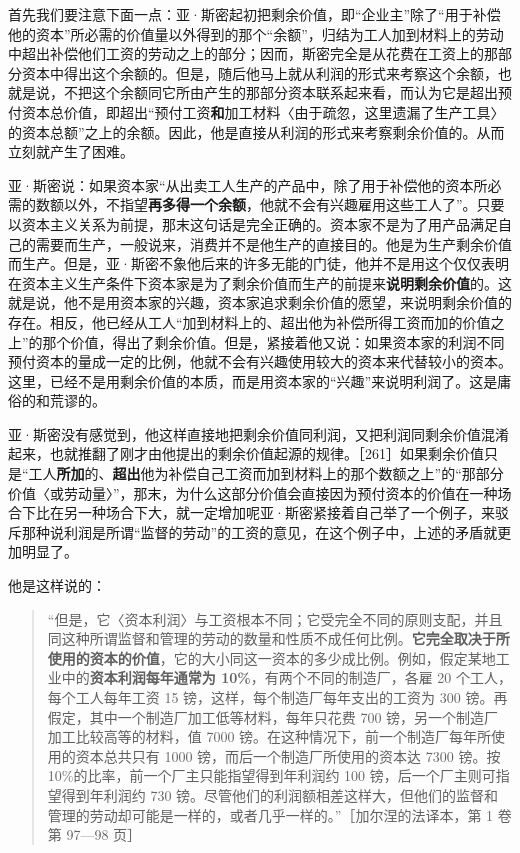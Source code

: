 首先我们要注意下面一点：亚·斯密起初把剩余价值，即“企业主”除了“用于补偿他的资本”所必需的价值量以外得到的那个“余额”，归结为工人加到材料上的劳动中超出补偿他们工资的劳动之上的部分；因而，斯密完全是从花费在工资上的那部分资本中得出这个余额的。但是，随后他马上就从利润的形式来考察这个余额，也就是说，不把这个余额同它所由产生的那部分资本联系起来看，而认为它是超出预付资本总价值，即超出“预付工资\textbf{和}加工材料〈由于疏忽，这里遗漏了生产工具〉的资本总额”之上的余额。因此，他是直接从利润的形式来考察剩余价值的。从而立刻就产生了困难。

亚·斯密说：如果资本家“从出卖工人生产的产品中，除了用于补偿他的资本所必需的数额以外，不指望\textbf{再多得一个余额}，他就不会有兴趣雇用这些工人了”。只要以资本主义关系为前提，那末这句话是完全正确的。资本家不是为了用产品满足自己的需要而生产，一般说来，消费并不是他生产的直接目的。他是为生产剩余价值而生产。但是，亚·斯密不象他后来的许多无能的门徒，他并不是用这个仅仅表明在资本主义生产条件下资本家是为了剩余价值而生产的前提来\textbf{说明剩余价值}的。这就是说，他不是用资本家的兴趣，资本家追求剩余价值的愿望，来说明剩余价值的存在。相反，他已经从工人“加到材料上的、超出他为补偿所得工资而加的价值之上”的那个价值，得出了剩余价值。但是，紧接着他又说：如果资本家的利润不同预付资本的量成一定的比例，他就不会有兴趣使用较大的资本来代替较小的资本。这里，已经不是用剩余价值的本质，而是用资本家的“兴趣”来说明利润了。这是庸俗的和荒谬的。

亚·斯密没有感觉到，他这样直接地把剩余价值同利润，又把利润同剩余价值混淆起来，也就推翻了刚才由他提出的剩余价值起源的规律。［261］如果剩余价值只是“工人\textbf{所加}的、\textbf{超出}他为补偿自己工资而加到材料上的那个数额之上”的“那部分价值〈或劳动量〉”，那末，为什么这部分价值会直接因为预付资本的价值在一种场合下比在另一种场合下大，就一定增加呢亚·斯密紧接着自己举了一个例子，来驳斥那种说利润是所谓“监督的劳动”的工资的意见，在这个例子中，上述的矛盾就更加明显了。

他是这样说的：

\begin{quote}“但是，它〈资本利润〉与工资根本不同；它受完全不同的原则支配，并且同这种所谓监督和管理的劳动的数量和性质不成任何比例。\textbf{它完全取决于所使用的资本的价值}，它的大小同这一资本的多少成比例。例如，假定某地工业中的\textbf{资本利润每年通常为 10\%}，有两个不同的制造厂，各雇 20 个工人，每个工人每年工资 15 镑，这样，每个制造厂每年支出的工资为 300 镑。再假定，其中一个制造厂加工低等材料，每年只花费 700 镑，另一个制造厂加工比较高等的材料，值 7000 镑。在这种情况下，前一个制造厂每年所使用的资本总共只有 1000 镑，而后一个制造厂所使用的资本达 7300 镑。按 10\%的比率，前一个厂主只能指望得到年利润约 100 镑，后一个厂主则可指望得到年利润约 730 镑。尽管他们的利润额相差这样大，但他们的监督和管理的劳动却可能是一样的，或者几乎一样的。”［加尔涅的法译本，第 1 卷第 97—98 页］\end{quote}

